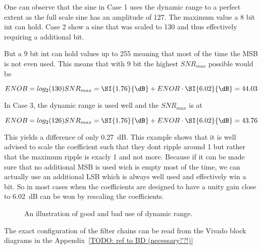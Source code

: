 One can observe that the sine in Case 1 uses the dynamic range to a perfect extent as the full scale sine has an amplitude of 127. The maximum value a 8 bit int can hold. Case 2 show a sine that was scaled to 130 and thus effectively requiring a additional bit. 

But a 9 bit int can hold values up to 255 meaning that most of the time the MSB is not even used. This means that with 9 bit the highest $SNR_{max}$ possible would be

\begin{equation}
    ENOB = log_2(130)\\
    SNR_{max} = \SI{1.76}{\dB} + ENOB \cdot \SI{6.02}{\dB} = 44.03
\end{equation}

In Case 3, the dynamic range is used well and the $SNR_{max}$ is at

\begin{equation}
    ENOB = log_2(126)\\
    SNR_{max} = \SI{1.76}{\dB} + ENOB \cdot \SI{6.02}{\dB} = 43.76
\end{equation}

This yields a difference of only \SI{0.27}{\dB}. This example shows that it is well advised to scale the coefficient such that they dont ripple around 1 but rather that the maximum ripple is exacly 1 and not more.
Because if it can be made sure that no additional MSB is used wich is empty most of the time, we can actually use an additional LSB which is always well used and effectively win a bit. So in most cases when the coefficients are designed to have a unity gain close to \SI{6.02}{\dB} can be won by rescaling the coefficients.

\begin{figure}
    \centering
    
    \caption{An illustration of good and bad use of dynamic range.}
    \label{fig:fpga:dynamicrange}
\end{figure}

The exact configuration of the filter chains can be read from the Vivado block diagrams in the Appendix~\ref{TODO: ref to BD (necessary??!)}